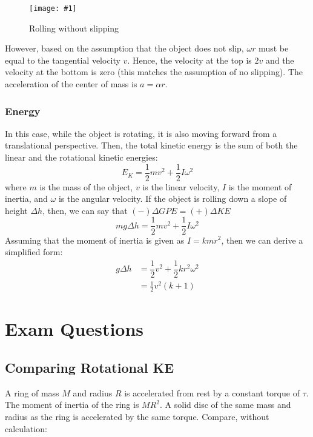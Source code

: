 \documentclass[a4paper,12pt]{article}
\let\oldsection\section
\renewcommand\section{\clearpage\oldsection}
\newcommand{\img}[4]{\begin{center}
  \begin{figure}[H]
    \centering
    \texttt{[image: \#1]}
    \caption{#3}
    \label{fig:#4}
  \end{figure}
\end{center}}
\begin{document}
\img{rolling.png}{0.8}{Rolling without slipping}{rolling}

However, based on the assumption that the object does not slip, $\omega r$ must be equal to the tangential velocity $v$. Hence, the velocity at the top is $2v$ and the velocity at the bottom is zero (this matches the assumption of no slipping). The acceleration of the center of mass is $a = \alpha r$.

\subsubsection{Energy}

In this case, while the object is rotating, it is also moving forward from a translational perspective. Then, the total kinetic energy is the sum of both the linear and the rotational kinetic energies: $$E_K = \dfrac{1}{2}mv^2 + \dfrac{1}{2}I\omega^2$$where $m$ is the mass of the object, $v$ is the linear velocity, $I$ is the moment of inertia, and $\omega$ is the angular velocity.
If the object is rolling down a slope of height $\Delta h$, then, we can say that $(-)\Delta GPE = (+)\Delta KE$
$$mg\Delta h = \dfrac{1}{2}mv^2 + \dfrac{1}{2}I\omega^2$$
Assuming that the moment of inertia is given as $I = kmr^2$, then we can derive a simplified form:
\begin{align*}
  g\Delta h & = \dfrac{1}{2}v^2 + \dfrac{1}{2}kr^2\omega^2 \\
            & = \frac{1}{2}v^2(k + 1)
\end{align*}

\pagebreak

\section{Exam Questions}

\subsection{Comparing Rotational KE}

A ring of mass $M$ and radius $R$ is accelerated from rest by a constant torque of $\tau$. The moment of inertia of the ring is $MR^2$. A solid disc of the same mass and radius as the ring is accelerated by
the same torque. Compare, without calculation:
\end{document}
